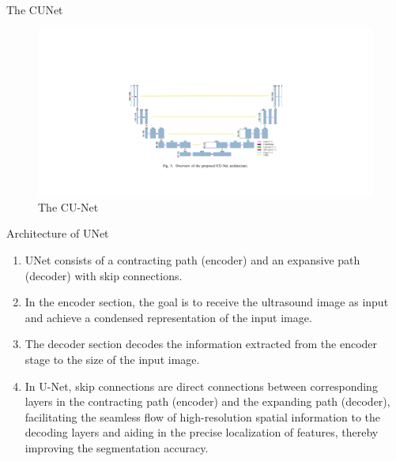 \documentclass{beamer}
\begin{document}
\begin{frame}{The CUNet}
    \begin{figure}[H]
        \centering
        \includegraphics[width=\textwidth]{cunet.jpg}
        \caption{The CU-Net}
        \label{fig:b}
    \end{figure}
\end{frame}
\begin{frame}{Architecture of UNet}
    \begin{enumerate}
        \item UNet consists of a contracting path (encoder) and an expansive path (decoder) with skip connections.
        \item In the encoder section, the goal is to receive the ultrasound image as input and achieve a condensed 
        representation of the input image.
        \item The decoder section decodes the information extracted from the encoder stage to the size of the input image.
        \item In U-Net, skip connections are direct connections between corresponding layers in the contracting
        path (encoder) and the expanding path (decoder), facilitating the seamless flow of high-resolution spatial 
        information to the decoding layers and aiding in the precise localization of features, thereby improving the 
        segmentation accuracy.
    \end{enumerate}
\end{frame}
\end{document}
